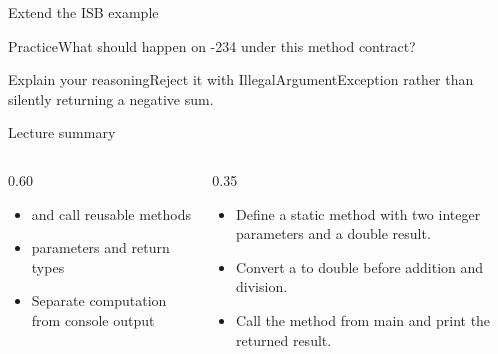 \documentclass[10pt,aspectratio=169]{beamer}
\begin{document}
\begin{frame}[fragile,t]{Extend the ISB example}
\begin{alertblock}{Practice}What should happen on {-}234 under this method contract?\end{alertblock}\vspace{3mm}\begin{exampleblock}{Explain your reasoning}Reject it with IllegalArgument\allowbreak Exception rather than silently returning a negative sum.\end{exampleblock}
\end{frame}
\begin{frame}[fragile,t]{Lecture summary}
\begin{columns}[T,onlytextwidth]\begin{column}{0.60\textwidth}
\begin{itemize}
\item and call reusable methods
\item parameters and return types
\item Separate computation from console output
\end{itemize}
\end{column}\begin{column}{0.35\textwidth}\small
\begin{itemize}
\item Define a static method with two integer parameters and a double result.
\item Convert a to double before addition and division.
\item Call the method from main and print the returned result.
\end{itemize}
\end{column}\end{columns}
\end{frame}
\end{document}
